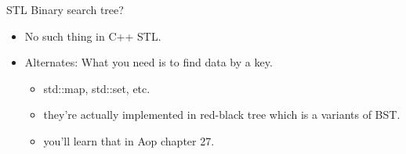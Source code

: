 \documentclass{beamer}
\begin{document}
\begin{frame}{STL Binary search tree?}

\begin{itemize}
    \item No such thing in C++ STL.
    \item Alternates: What you need is to find  data by a key.
        \begin{itemize}
            \item std::map, std::set, etc.
            \item they're actually implemented in red-black tree which is a variants of BST.
            \item you'll learn that in Aop chapter 27.
        \end{itemize}
\end{itemize}
    
\end{frame}
\end{document}

